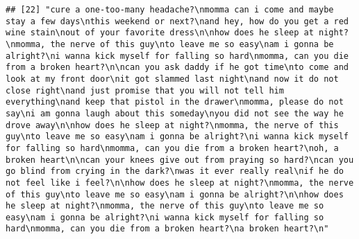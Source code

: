 \documentclass[]{article}
\begin{document}
\begin{verbatim}
## [22] "cure a one-too-many headache?\nmomma can i come and maybe stay a few days\nthis weekend or next?\nand hey, how do you get a red wine stain\nout of your favorite dress\n\nhow does he sleep at night?\nmomma, the nerve of this guy\nto leave me so easy\nam i gonna be alright?\ni wanna kick myself for falling so hard\nmomma, can you die from a broken heart?\n\ncan you ask daddy if he got time\nto come and look at my front door\nit got slammed last night\nand now it do not close right\nand just promise that you will not tell him everything\nand keep that pistol in the drawer\nmomma, please do not say\ni am gonna laugh about this someday\nyou did not see the way he drove away\n\nhow does he sleep at night?\nmomma, the nerve of this guy\nto leave me so easy\nam i gonna be alright?\ni wanna kick myself for falling so hard\nmomma, can you die from a broken heart?\noh, a broken heart\n\ncan your knees give out from praying so hard?\ncan you go blind from crying in the dark?\nwas it ever really real\nif he do not feel like i feel?\n\nhow does he sleep at night?\nmomma, the nerve of this guy\nto leave me so easy\nam i gonna be alright?\n\nhow does he sleep at night?\nmomma, the nerve of this guy\nto leave me so easy\nam i gonna be alright?\ni wanna kick myself for falling so hard\nmomma, can you die from a broken heart?\na broken heart?\n"                                                                                                                                                                                                                                                                                                                                                                                                                                                                                                                                                                                                                                                                                                                                                                                                                                                                                                                                                                                                                                                                                                                                                                                                                                                                                                                                                                                                                                                                                                                                                                              

\end{verbatim}
\end{document}
